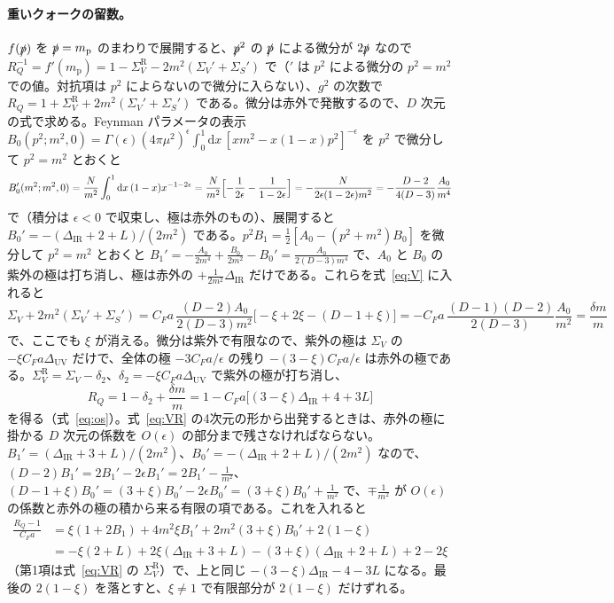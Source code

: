 \documentclass[a4paper,10pt]{ltjsarticle}
\newcommand{\dd}{\mathrm{d}}
\newcommand{\DUV}{\Delta_{\mathrm{UV}}}
\newcommand{\DIR}{\Delta_{\mathrm{IR}}}
\begin{document}
\paragraph{重いクォークの留数。}$f(\slashed p)$ を $\slashed p=m_{\mathrm p}$ のまわりで展開すると、$\slashed p^2$ の $\slashed p$ による微分が $2\slashed p$ なので $R_Q^{-1}=f'(m_{\mathrm p})=1-\Sigma_V^{\mathrm R}-2m^2(\Sigma_V'+\Sigma_S')$ で（$'$ は $p^2$ による微分の $p^2=m^2$ での値。対抗項は $p^2$ によらないので微分に入らない）、$g^2$ の次数で $R_Q=1+\Sigma_V^{\mathrm R}+2m^2(\Sigma_V'+\Sigma_S')$ である。微分は赤外で発散するので、$D$ 次元の式で求める。Feynman パラメータの表示 $B_0(p^2;m^2,0)=\Gamma(\epsilon)(4\pi\mu^2)^\epsilon\int_0^1\dd x\,[xm^2-x(1-x)p^2]^{-\epsilon}$ を $p^2$ で微分して $p^2=m^2$ とおくと
\begin{equation*}
B_0'(m^2;m^2,0)=\frac{N}{m^2}\int_0^1\dd x\,(1-x)x^{-1-2\epsilon}=\frac{N}{m^2}\Bigl[-\frac1{2\epsilon}-\frac1{1-2\epsilon}\Bigr]=-\frac{N}{2\epsilon(1-2\epsilon)m^2}=-\frac{D-2}{4(D-3)}\frac{A_0}{m^4}
\end{equation*}
で（積分は $\epsilon<0$ で収束し、極は赤外のもの）、展開すると $B_0'=-(\DIR+2+L)/(2m^2)$ である。$p^2B_1=\frac12[A_0-(p^2+m^2)B_0]$ を微分して $p^2=m^2$ とおくと $B_1'=-\frac{A_0}{2m^4}+\frac{B_0}{2m^2}-B_0'=\frac{A_0}{2(D-3)m^4}$ で、$A_0$ と $B_0$ の紫外の極は打ち消し、極は赤外の $+\frac{1}{2m^2}\DIR$ だけである。これらを式~\eqref{eq:V} に入れると
\begin{equation*}
\Sigma_V+2m^2(\Sigma_V'+\Sigma_S')=C_Fa\,\frac{(D-2)A_0}{2(D-3)m^2}\bigl[-\xi+2\xi-(D-1+\xi)\bigr]=-C_Fa\,\frac{(D-1)(D-2)}{2(D-3)}\frac{A_0}{m^2}=\frac{\delta m}m
\end{equation*}
で、ここでも $\xi$ が消える。微分は紫外で有限なので、紫外の極は $\Sigma_V$ の $-\xi C_Fa\DUV$ だけで、全体の極 $-3C_Fa/\epsilon$ の残り $-(3-\xi)C_Fa/\epsilon$ は赤外の極である。$\Sigma_V^{\mathrm R}=\Sigma_V-\delta_2$、$\delta_2=-\xi C_Fa\DUV$ で紫外の極が打ち消し、
\begin{equation*}
R_Q=1-\delta_2+\frac{\delta m}{m}=1-C_Fa\bigl[(3-\xi)\DIR+4+3L\bigr]
\end{equation*}
を得る（式~\eqref{eq:os}）。式~\eqref{eq:VR} の4次元の形から出発するときは、赤外の極に掛かる $D$ 次元の係数を $O(\epsilon)$ の部分まで残さなければならない。$B_1'=(\DIR+3+L)/(2m^2)$、$B_0'=-(\DIR+2+L)/(2m^2)$ なので、$(D-2)B_1'=2B_1'-2\epsilon B_1'=2B_1'-\frac1{m^2}$、$(D-1+\xi)B_0'=(3+\xi)B_0'-2\epsilon B_0'=(3+\xi)B_0'+\frac1{m^2}$ で、$\mp\frac1{m^2}$ が $O(\epsilon)$ の係数と赤外の極の積から来る有限の項である。これを入れると
\begin{equation*}
\begin{aligned}
\frac{R_Q-1}{C_Fa}&=\xi(1+2B_1)+4m^2\xi B_1'+2m^2(3+\xi)B_0'+2(1-\xi)\\
&=-\xi(2+L)+2\xi(\DIR+3+L)-(3+\xi)(\DIR+2+L)+2-2\xi
\end{aligned}
\end{equation*}
（第1項は式~\eqref{eq:VR} の $\Sigma_V^{\mathrm R}$）で、上と同じ $-(3-\xi)\DIR-4-3L$ になる。最後の $2(1-\xi)$ を落とすと、$\xi\ne1$ で有限部分が $2(1-\xi)$ だけずれる。
\end{document}
